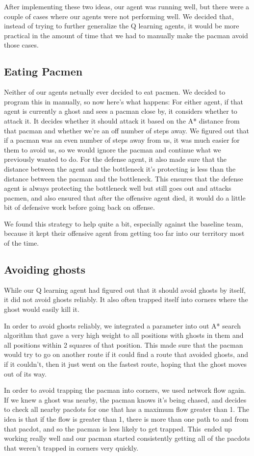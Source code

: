 \documentclass[11pt]{article}
\begin{document}
After implementing these two ideas, our agent was running well, but there were a couple of cases where our agents
were not performing well. We decided that, instead of trying to further generalize the Q learning agents,
it would be more practical in the amount of time that we had to manually make the pacman avoid those cases.

\subsection{Eating Pacmen}
Neither of our agents netually ever decided to eat pacmen. We decided to program this in manually, so now here's what happens:
For either agent, if that agent is currently a ghost and sees a pacman close by, it considers whether to attack it.
It decides whether it should attack it based on the A* distance from that pacman and whether we're an off number of steps away.
We figured out that if a pacman was an even number of steps away from us, it was much easier for them to avoid us, so we would
ignore the pacman and continue what we previously wanted to do. For the defense agent, it also made sure that the distance between
the agent and the bottleneck it's protecting is less than the distance between the pacman and the bottleneck. This ensures that
the defense agent is always protecting the bottleneck well but still goes out and attacks pacmen, and also ensured that after
the offensive agent died, it would do a little bit of defensive work before going back on offense.

We found this strategy to help quite a bit, especially against the baseline team, because it kept their offensive agent from
getting too far into our territory most of the time.

\subsection{Avoiding ghosts}

While our Q learning agent had figured out that it should avoid ghosts by itself, it did not avoid ghosts reliably. It also often
trapped itself into corners where the ghost would easily kill it.

In order to avoid ghosts reliably, we integrated a parameter into out A* search algorithm that gave a very high weight to
all positions with ghosts in them and all positions within 2 squares of that position. This made sure that the pacman would try
to go on another route if it could find a route that avoided ghosts, and if it couldn't, then it just went on the fastest route,
hoping that the ghost moves out of its way.

In order to avoid trapping the pacman into corners, we used network flow again. If we knew a ghost was nearby, the pacman knows
it's being chased, and decides to check all nearby pacdots for one that has a maximum flow greater than 1. The idea is that if the
flow is greater than 1, there is more than one path to and from that pacdot, and so the pacman is less likely to get trapped. This\
ended up working really well and our pacman started consistently getting all of the pacdots that weren't trapped in corners very quickly.
\end{document}
